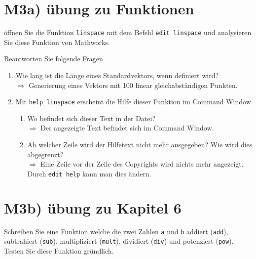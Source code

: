 \section{M3a) übung zu Funktionen}
öffnen Sie die Funktion {\color{magenta}\texttt{linspace}} mit dem Befehl {\color{magenta}\texttt{edit linspace}} und analysieren Sie diese Funktion von Mathworks. 

Beantworten Sie folgende Fragen
\begin{enumerate}[$a)$]
\item Wie lang ist die Länge eines Standardvektors, wenn {\color{magenta}{keine Länge}} definiert wird?
\\
$\Longrightarrow$ Generierung eines Vektors mit 100 linear gleichabständigen Punkten.
\item Mit {\color{magenta}\texttt{help linspace}} erscheint die Hilfe dieser Funktion im Command Window 
\begin{enumerate}[$\bullet$]
\item Wo befindet sich dieser Text in der Datei?
\\
$\Longrightarrow$ Der angezeigte Text befindet sich im Command Window.
\item Ab welcher Zeile wird der Hilfetext nicht mehr ausgegeben? Wie wird dies abgegrenzt?
\\
$\Longrightarrow$ Eine Zeile vor der Zeile des Copyrights wird nichts mehr angezeigt. Durch {\color{magenta}\texttt{edit help}} kann man dies ändern.
\end{enumerate}
\end{enumerate}
\section{M3b) übung zu Kapitel 6}
Schreiben Sie eine Funktion welche die zwei Zahlen \texttt{a} und \texttt{b} addiert ({\color{magenta}\texttt{add}}), subtrahiert ({\color{magenta}\texttt{sub}}), multipliziert ({\color{magenta}\texttt{mult}}), dividiert ({\color{magenta}\texttt{div}}) und potenziert ({\color{magenta}\texttt{pow}}). Testen Sie diese Funktion gründlich. 

